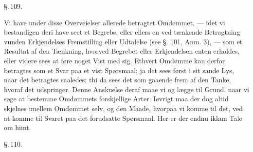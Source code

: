 \documentclass[12pt]{book}
\def\textit#1{#1}%
\newcommand{\parag}[1]{%
  \par\vspace{0.9\baselineskip}%
  {\centering\textit{\S.\,#1.}\par}%
  \vspace{0.35\baselineskip}%
  \noindent\hspace{\parindent}\ignorespaces
}
\begin{document}
\parag{109}

Vi have under disse Overveielser allerede betragtet Omdømmet, --- idet vi bestandigen deri
have seet et Begrebs, eller ellers en ved tænkende Betragtning vunden Erkjendelses
Fremstilling eller Udtalelse (see §. 101, Anm. 3), --- som et Resultat af den Tænkning,
hvorved Begrebet eller Erkjendelsen enten erholdes, eller videre sees at føre noget Vist
med sig. Ethvert Omdømme kan derfor betragtes som et Svar paa et vist Spørsmaal; ja det
sees først i sit sande Lys, naar det betragtes saaledes; thi da sees det som gaaende frem
af den Tanke, hvoraf det udspringer. Denne Anskuelse deraf maae vi og lægge til Grund, naar
vi søge at bestemme Omdømmets forskjellige Arter. Iøvrigt maa der dog altid skjelnes
imellem Omdømmet selv, og den Maade, hvorpaa vi komme til det, ved at komme til Svaret paa
det forudsatte Spørsmaal. Her er der endnu ikkun Tale om hiint.

\parag{110}
\end{document}
